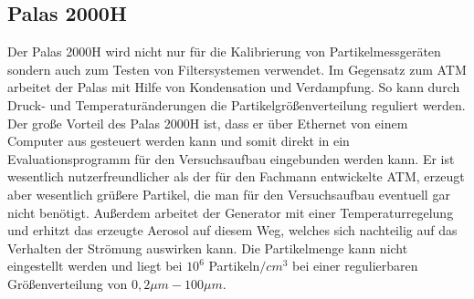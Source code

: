 \subsection{Palas 2000H}
Der Palas 2000H wird nicht nur f\"{u}r die Kalibrierung von Partikelmessger\"{a}ten sondern auch zum Testen von Filtersystemen verwendet. Im Gegensatz zum ATM arbeitet der Palas mit Hilfe von Kondensation und Verdampfung. So kann durch Druck- und Temperatur\"{a}nderungen die Partikelgr\"{o}{\ss}enverteilung reguliert werden. Der gro{\ss}e Vorteil des Palas 2000H ist, dass er \"{u}ber Ethernet von einem Computer aus gesteuert werden kann und somit direkt in ein Evaluationsprogramm f\"{u}r den Versuchsaufbau eingebunden werden kann. Er ist wesentlich nutzerfreundlicher als der f\"{u}r den Fachmann entwickelte ATM, erzeugt aber wesentlich gr\"{u}{\ss}ere Partikel, die man f\"{u}r den Versuchsaufbau eventuell gar nicht ben\"{o}tigt. Au{\ss}erdem arbeitet der Generator mit einer Temperaturregelung und erhitzt das erzeugte Aerosol auf diesem Weg, welches sich nachteilig auf das Verhalten der Str\"{o}mung auswirken kann. Die Partikelmenge kann nicht eingestellt werden und liegt bei \(10^6\) Partikeln\(/cm^3\) bei einer regulierbaren Gr\"{o}{\ss}enverteilung von \(0,2 \mu m - 100\mu m\).